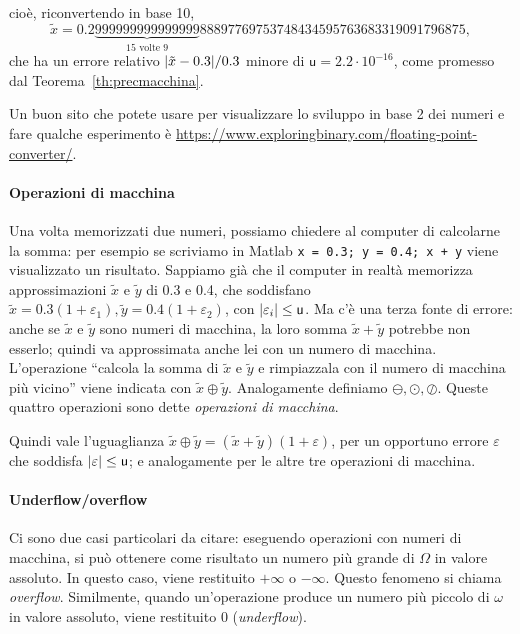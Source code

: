 \documentclass[a4paper]{report}
\DeclarePairedDelimiter{\abs}{\lvert}{\rvert}
\theoremstyle{definition}
\theoremstyle{remark}
\begin{document}
cioè, riconvertendo in base 10,
\[
\tilde{x} = 0.2\underbrace{999999999999999}_{\text{15 volte 9}}88897769753748434595763683319091796875,
\]
che ha un errore relativo $\abs{\tilde{x}- 0.3} / 0.3$ minore di $\mathsf{u} = 
2.2 \cdot 10^{-16}$, come promesso dal Teorema~\ref{th:precmacchina}.

Un buon sito che potete usare per visualizzare lo sviluppo in base 2 dei numeri e fare qualche esperimento è \url{https://www.exploringbinary.com/floating-point-converter/}.

\paragraph{Operazioni di macchina}

Una volta memorizzati due numeri, possiamo chiedere al computer di calcolarne la somma: per esempio se scriviamo in Matlab
\texttt{x = 0.3; y = 0.4; x + y} viene visualizzato un risultato. Sappiamo già che il computer in realtà memorizza approssimazioni $\tilde{x}$ e $\tilde{y}$ di 0.3 e 0.4, che soddisfano $\tilde{x} = 0.3(1+\varepsilon_1), \tilde{y} = 0.4(1+\varepsilon_2)$, con $\abs{\varepsilon_i} \leq \mathsf{u}$. Ma c'è una terza fonte di errore: anche se $\tilde{x}$ e $\tilde{y}$ sono numeri di macchina, la loro somma $\tilde{x} + \tilde{y}$ potrebbe non esserlo; quindi va approssimata anche lei con un numero di macchina. L'operazione ``calcola la somma di $\tilde{x}$ e $\tilde{y}$ e rimpiazzala con il numero di macchina più vicino'' viene indicata con $\tilde{x} \oplus \tilde{y}$. Analogamente definiamo $\ominus, \odot, \oslash$. Queste quattro operazioni sono dette \emph{operazioni di macchina}. 

Quindi vale l'uguaglianza $\tilde{x} \oplus \tilde{y} = (\tilde{x}+\tilde{y})(1+\varepsilon)$, per un opportuno errore $\varepsilon$ che soddisfa $\abs{\varepsilon} \leq \mathsf{u}$; e analogamente per le altre tre operazioni di macchina.

\paragraph{Underflow/overflow} Ci sono due casi particolari da citare: eseguendo operazioni con numeri di macchina, si può ottenere come risultato un numero più grande di $\Omega$ in valore assoluto. In questo caso, viene restituito $+\infty$ o $-\infty$. Questo fenomeno si chiama \emph{overflow}. Similmente, quando un'operazione produce un numero più piccolo di $\omega$ in valore assoluto, viene restituito $0$ (\emph{underflow}).
\end{document}
